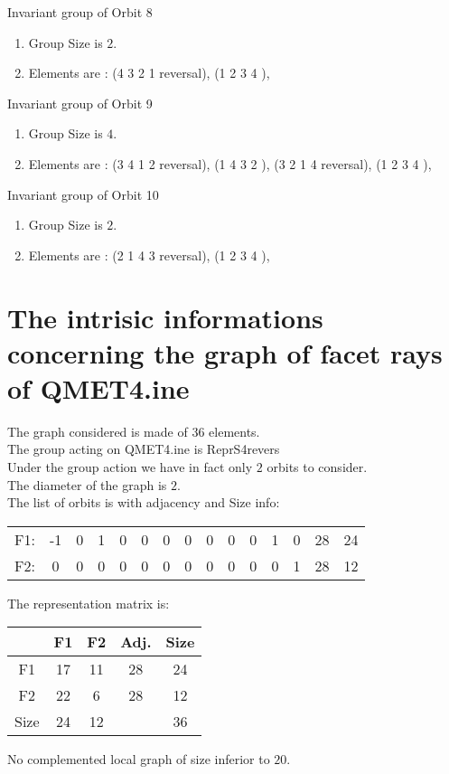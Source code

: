 \documentclass[12pt]{article}
\begin{document}
Invariant group of Orbit 8
\begin{enumerate}
\item Group Size is $2$.
\item Elements are : (4 3 2 1   reversal), (1 2 3 4  ), 
\end{enumerate}
Invariant group of Orbit 9
\begin{enumerate}
\item Group Size is $4$.
\item Elements are : (3 4 1 2   reversal), (1 4 3 2  ), (3 2 1 4   reversal), (1 2 3 4  ), 
\end{enumerate}
Invariant group of Orbit 10
\begin{enumerate}
\item Group Size is $2$.
\item Elements are : (2 1 4 3   reversal), (1 2 3 4  ), 
\end{enumerate}
\section{The intrisic informations concerning the graph of facet rays of QMET4.ine}
The graph considered is made of $36$ elements.\\
The group acting on QMET4.ine is ReprS4revers\\
Under the group action we have in fact only $2$ orbits to consider.\\
The diameter of the graph is $2$.\\
The list of orbits is with adjacency and Size info:
\begin{center}
\scriptsize
\begin{tabular}{ccccccccccccc|c|c}
F1:&-1&0&1&0&0&0&0&0&0&0&1&0&28&24\\
F2:&0&0&0&0&0&0&0&0&0&0&0&1&28&12\\
\end{tabular}
\end{center}
The representation matrix is:
\begin{center}
\scriptsize
\begin{tabular}{|c|cc|c|c|}
\hline
&F1&F2&Adj.&Size\\
\hline
F1& 17& 11&28&24\\
F2& 22& 6&28&12\\
\hline
Size&24&12&&36\\
\hline
\end{tabular}
\end{center}
No complemented local graph of size inferior to $20$.
\end{document}

